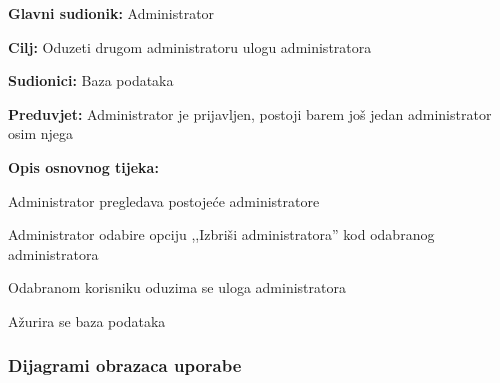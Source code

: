 						\noindent {}
						\begin{packed_item}
							
							\item \textbf{Glavni sudionik: }Administrator
							\item  \textbf{Cilj: }Oduzeti drugom administratoru ulogu administratora
							\item  \textbf{Sudionici: }Baza podataka
							\item  \textbf{Preduvjet: }Administrator je prijavljen, postoji barem još jedan administrator osim njega
							\item  \textbf{Opis osnovnog tijeka:}
							
							\item[] \begin{packed_enum}
								
								\item Administrator pregledava postojeće administratore
								\item Administrator odabire opciju ,,Izbriši administratora” kod odabranog administratora
								\item Odabranom korisniku oduzima se uloga administratora
								\item Ažurira se baza podataka
		 
							\end{packed_enum}
							
							
						\end{packed_item}
						
					
				\subsubsection{Dijagrami obrazaca uporabe}
					
					
					
